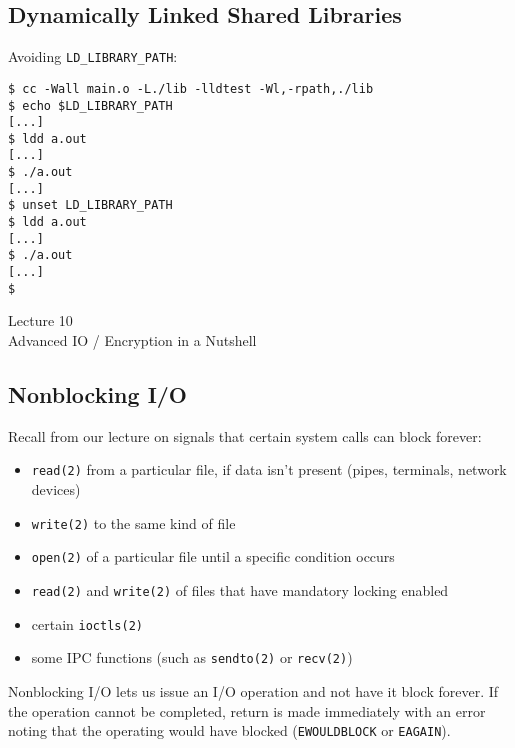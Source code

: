 \documentclass[xga]{xdvislides}
\begin{document}
\subsection{Dynamically Linked Shared Libraries}
Avoiding {\tt LD\_LIBRARY\_PATH}:
\begin{verbatim}
$ cc -Wall main.o -L./lib -lldtest -Wl,-rpath,./lib
$ echo $LD_LIBRARY_PATH
[...]
$ ldd a.out
[...]
$ ./a.out
[...]
$ unset LD_LIBRARY_PATH
$ ldd a.out
[...]
$ ./a.out
[...]
$
\end{verbatim}

\newpage
\vspace*{\fill}
\begin{center}
  \Hugesize
	Lecture 10
	\hspace*{5mm}\blueline\\ [1em]
	Advanced IO / Encryption in a Nutshell
  \Normalsize
\end{center}
\vspace*{\fill}

\subsection{Nonblocking I/O}
Recall from our lecture on signals that certain system calls can block forever:
\begin{itemize}
	\item {\tt read(2)} from a particular file, if data isn't present (pipes,
		terminals, network devices)
	\item {\tt write(2)} to the same kind of file
	\item {\tt open(2)} of a particular file until a specific condition occurs
	\item {\tt read(2)} and {\tt write(2)} of files that have mandatory
		locking enabled
	\item certain {\tt ioctls(2)}
	\item some IPC functions (such as {\tt sendto(2)} or {\tt recv(2)})
\end{itemize}
\vspace{.25in}
Nonblocking I/O lets us issue an I/O operation and not have it block forever.
If the operation cannot be completed, return is made immediately with an error
noting that the operating would have blocked ({\tt EWOULDBLOCK} or {\tt EAGAIN}).
\end{document}
